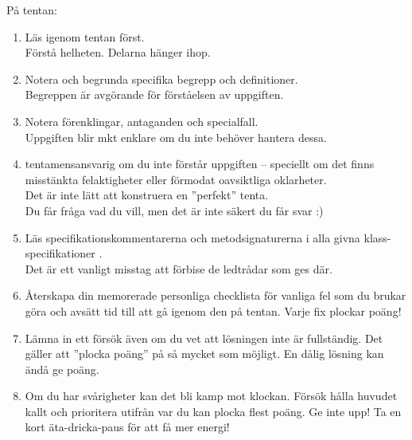 \begin{Slide}{På tentan:} \SlideFontTiny
\begin{enumerate}
\item Läs igenom  tentan först. \\  Förstå helheten. Delarna hänger ihop.
\item Notera och begrunda specifika begrepp och definitioner. \\  Begreppen är avgörande för förståelsen av uppgiften.
\item Notera förenklingar, antaganden och specialfall. \\  Uppgiften blir mkt enklare om du inte behöver hantera dessa.
\item {} tentamensansvarig om du inte förstår uppgiften -- speciellt om det finns misstänkta felaktigheter eller förmodat oavsiktliga oklarheter. \\  Det är inte lätt att konstruera en ''perfekt'' tenta. \\ Du får fråga vad du vill, men det är inte säkert du får svar :)
\item Läs specifikationskommentarerna och metodsignaturerna i alla givna klass-specifikationer . \\  Det är ett vanligt misstag att förbise de ledtrådar som ges där.
\item Återskapa din memorerade personliga checklista för vanliga fel som du brukar göra och avsätt tid till att gå igenom den på tentan. Varje fix plockar poäng!
\item Lämna in ett försök även om du vet att lösningen inte är fullständig. Det gäller att ''plocka poäng'' på så mycket som möjligt. En dålig lösning kan ändå ge poäng.

\item Om du har svårigheter kan det bli kamp mot klockan. Försök hålla huvudet kallt och prioritera utifrån var du kan plocka flest poäng. Ge inte upp! Ta en kort äta-dricka-paus för att få mer energi!

\end{enumerate}
\end{Slide}

\ifkompendium\else

